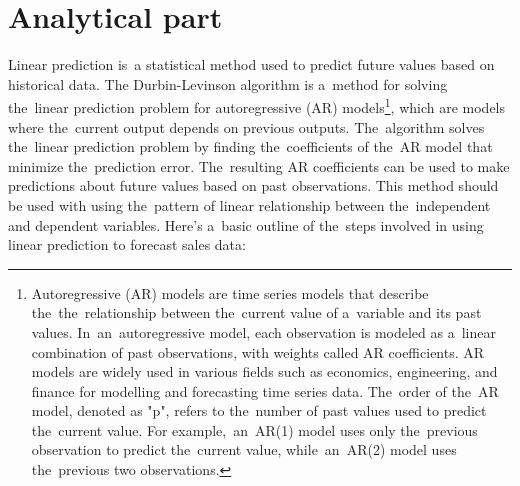 
\chapter{Analytical part}\label{sec:analytical}

Linear prediction is~a statistical method used to predict future values based on historical data.
The Durbin-Levinson algorithm is a~method for solving the~linear prediction problem for autoregressive (AR)
models\footnote{Autoregressive (AR) models are time series models that describe the~the~relationship between the~current
value of a~variable and its past values. In~an~autoregressive model, each observation is modeled as a~linear
combination of past observations, with weights called AR coefficients. AR models are widely used in various fields
such as economics, engineering, and finance for modelling and forecasting time series data. The~order of the~AR model, denoted as "p", refers to the~number of past values used to predict the~current value. For example,~an~AR(1) model uses
only the~previous observation to predict the~current value, while~an~AR(2) model uses the~previous two observations.},
which are models where the~current output depends on previous outputs. The~algorithm solves the~linear prediction
problem by finding the~coefficients of the~AR model that minimize the~prediction error. The~resulting AR coefficients
can be used to make predictions about future values based on past observations. This method should be used with
using the~pattern of linear relationship between the~independent and dependent variables.
Here's a~basic outline of the~steps involved in using linear prediction to forecast sales data:\\
